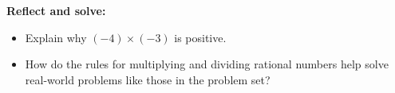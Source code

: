\documentclass[12pt]{article}
\begin{document}
\vspace{1em}

\begin{tcolorbox}[colframe=black!60, colback=white, 
coltitle=black, colbacktitle=black!15, fonttitle=\bfseries\Large, 
title=Exit Ticket, halign title=center, left=10pt, right=10pt, top=10pt, bottom=15pt]
\textbf{Reflect and solve:}
\begin{itemize}
    \item Explain why \( (-4) \times (-3) \) is positive.
    \item How do the rules for multiplying and dividing rational numbers help solve real-world problems like those in the problem set?
\end{itemize}
\end{tcolorbox}
\end{document}
